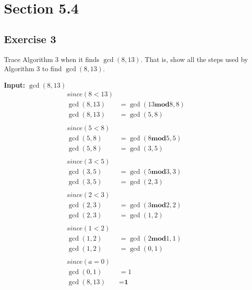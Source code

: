 \documentclass[12pt]{article}
\begin{document}
    \section{Section 5.4}
    \subsection{Exercise 3}
    Trace Algorithm 3 when it finds $\gcd(8,13)$. That is, show all the steps used by Algorithm 3 to find $\gcd(8,13)$.
    
            \textbf{Input:} $\gcd(8, 13)$ \\
            \begin{equation}
                \begin{split}
                   since(8 < 13) &\\
                        \gcd(8, 13) &= \gcd(13 \textbf{mod} 8,8)\\
                        \gcd(8, 13) &= \gcd(5, 8) \\
                        \\
                   since(5 < 8) &\\
                        \gcd(5, 8) &= \gcd(8 \textbf{mod} 5,5)\\
                        \gcd(5, 8) &= \gcd(3, 5) \\
                        \\
                   since(3 < 5) &\\
                        \gcd(3, 5) &= \gcd(5 \textbf{mod} 3,3)\\
                        \gcd(3, 5) &= \gcd(2, 3) \\
                        \\
                   since(2 < 3) &\\
                        \gcd(2, 3) &= \gcd(3 \textbf{mod} 2,2)\\
                        \gcd(2, 3) &= \gcd(1, 2) \\
                        \\
                   since(1 < 2) &\\
                        \gcd(1, 2) &= \gcd(2 \textbf{mod} 1,1)\\
                        \gcd(1, 2) &= \gcd(0, 1) \\
                        \\
                   since(a = 0) &\\
                        \gcd(0, 1) &= 1\\
                        \gcd(8, 13) &= \textbf{1}
                \end{split}
            \end{equation}
\end{document}

